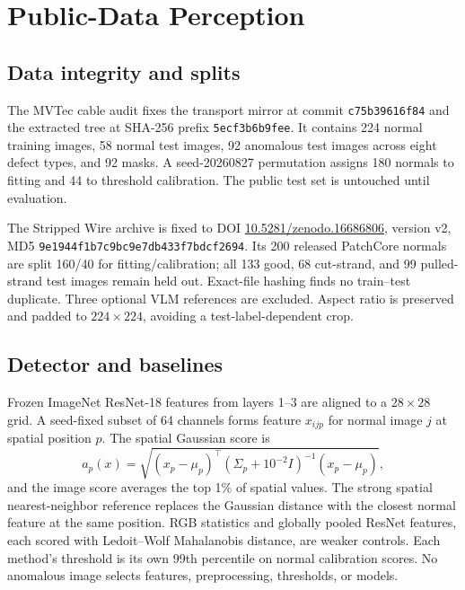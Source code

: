 \documentclass[journal]{IEEEtran}
\begin{document}
\section{Public-Data Perception}

\subsection{Data integrity and splits}

The MVTec cable audit fixes the transport mirror at commit
\texttt{c75b39616f84} and the extracted tree at SHA-256 prefix
\texttt{5ecf3b6b9fee}.  It contains 224 normal training images, 58 normal test
images, 92 anomalous test images across eight defect types, and 92 masks.
A seed-20260827 permutation assigns 180 normals to fitting and 44 to threshold
calibration.  The public test set is untouched until evaluation.

The Stripped Wire archive is fixed to DOI
\href{https://doi.org/10.5281/zenodo.16686806}{10.5281/zenodo.16686806}, version
v2, MD5 \texttt{9e1944f1b7c9bc9e7db433f7bdcf2694}.  Its 200 released
PatchCore normals are split 160/40 for fitting/calibration; all 133 good, 68
cut-strand, and 99 pulled-strand test images remain held out.  Exact-file hashing
finds no train--test duplicate.  Three optional VLM references are excluded.
Aspect ratio is preserved and padded to $224\!\times\!224$, avoiding a
test-label-dependent crop.

\subsection{Detector and baselines}

Frozen ImageNet ResNet-18 features from layers 1--3 are aligned to a
$28\!\times\!28$ grid.  A seed-fixed subset of 64 channels forms feature
$x_{ijp}$ for normal image $j$ at spatial position $p$.  The spatial Gaussian
score is
\begin{equation}
 a_p(x)=\sqrt{(x_p-\mu_p)^\top(\Sigma_p+10^{-2}I)^{-1}(x_p-\mu_p)},
\end{equation}
and the image score averages the top 1\% of spatial values.  The strong spatial
nearest-neighbor reference replaces the Gaussian distance with the closest
normal feature at the same position.  RGB statistics and globally pooled
ResNet features, each scored with Ledoit--Wolf Mahalanobis distance, are weaker
controls.  Each method's threshold is its own 99th percentile on normal
calibration scores.  No anomalous image selects features, preprocessing,
thresholds, or models.
\end{document}

